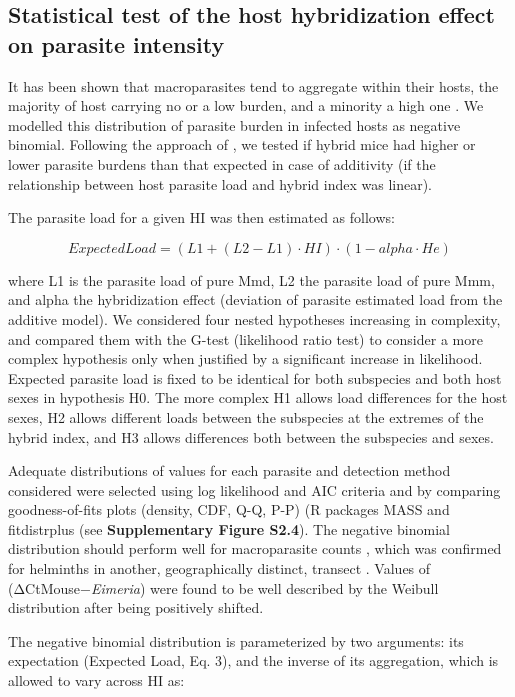 \subsection{Statistical test of the host hybridization effect on parasite intensity}
It has been shown that macroparasites tend to aggregate within their hosts, the majority of host carrying no or a low burden, and a minority a high one \citep{shaw_patterns_1995}. We modelled this distribution of parasite burden in infected hosts as negative binomial. Following the approach of \cite{baird_where_2012}, we tested if hybrid mice had higher or lower parasite burdens than that expected in case of additivity (if the relationship between host parasite load and hybrid index was linear). 
\par The parasite load for a given HI was then estimated as follows:

\begin{equation}
ExpectedLoad=(L1 + (L2 − L1) · HI) · (1 − alpha · He)
\end{equation}

where L1 is the parasite load of pure Mmd, L2 the parasite load of pure Mmm, and alpha the hybridization effect (deviation of parasite estimated load from the additive model). We considered four nested hypotheses increasing in complexity, and compared them with the G-test (likelihood ratio test) to consider a more complex hypothesis only when justified by a significant increase in likelihood. Expected parasite load is fixed to be identical for both subspecies and both host sexes in hypothesis H0. The more complex H1 allows load differences for the host sexes, H2 allows different loads between the subspecies at the extremes of the hybrid index, and H3 allows differences both between the subspecies and sexes.
\par Adequate distributions of values for each parasite and detection method considered were selected using log likelihood and AIC criteria and by comparing goodness-of-fits plots (density, CDF, Q-Q, P-P) (R packages MASS \citep{venables_modern_2002} and fitdistrplus \citep{delignette-muller_fitdistrplus_2015} (see \textbf{Supplementary Figure S2.4}). The negative binomial distribution should perform well for macroparasite counts \citep{crofton_quantitative_1971, shaw_patterns_1995}, which was confirmed for helminths in another, geographically distinct, transect \citep{baird_where_2012}. Values of (ΔCtMouse−\textit{Eimeria}) were found to be well described by the Weibull distribution after being positively shifted. 
\par The negative binomial distribution is parameterized by two arguments: its expectation (Expected Load, Eq. 3), and the inverse of its aggregation, which is allowed to vary across HI as:

